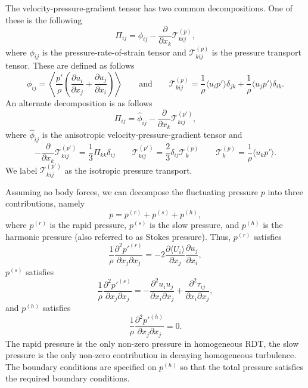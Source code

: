 \documentclass[oneside,a4paper,11pt]{report}
\newcommand{\pfluc}{p'}
\newcommand{\rs}{\tau}          %
\newcommand{\redi}{\phi}        %
\newcommand{\uiavg}{\langle U_i \rangle}
\newcommand{\uifluc}{u_i}
\newcommand{\ujfluc}{u_j}
\newcommand{\ukfluc}{u_k}
\begin{document}
The velocity-pressure-gradient tensor has two common decompositions. One of these is the following
\begin{equation}
\Pi_{ij} = \redi_{ij} - \frac{\partial}{\partial x_k} \mathcal{T}^{(p)}_{kij},
\end{equation}
where $\redi_{ij}$ is the pressure-rate-of-strain tensor and $\mathcal{T}^{(p)}_{kij}$ is the pressure transport tensor. These are defined as follows
\begin{equation}
\redi_{ij} = \left \langle \frac{\pfluc}{\rho} \left ( \frac{\partial \uifluc}{\partial x_j} + \frac{\partial \ujfluc}{\partial x_i} \right ) \right \rangle \qquad \text{and} \qquad \mathcal{T}^{(p)}_{kij} = \frac{1}{\rho} \langle \uifluc \pfluc \rangle \delta_{jk} + \frac{1}{\rho} \langle \ujfluc \pfluc \rangle \delta_{ik}.
\end{equation}
An alternate decomposition is as follows
\begin{equation}
\Pi_{ij} = \hat{\redi}_{ij} - \frac{\partial}{\partial x_k} \mathcal{T}^{(p')}_{kij},
\end{equation}
where $\hat{\redi}_{ij}$ is the anisotropic velocity-pressure-gradient tensor and
\begin{equation}
- \frac{\partial}{\partial x_k} \mathcal{T}^{(p')}_{kij} = \frac{1}{3} \Pi_{kk} \delta_{ij} \qquad
\mathcal{T}^{(p')}_{kij} =  \frac{2}{3} \delta_{ij} \mathcal{T}^{(p)}_k \qquad
\mathcal{T}^{(p)}_{k} = \frac{1}{\rho} \langle \ukfluc \pfluc \rangle.
\end{equation}
We label $\mathcal{T}^{(p')}_{kij}$ as the isotropic pressure transport.

Assuming no body forces, we can decompose the fluctuating pressure $p$ into three contributions, namely
\begin{equation}
p = p^{(r)} + p^{(s)} + p^{(h)},
\end{equation}
where $p^{(r)}$ is the rapid pressure, $p^{(s)}$ is the slow pressure, and $p^{(h)}$ is the harmonic pressure (also referred to as Stokes pressure). Thus, $p^{(r)}$ satisfies
\begin{equation}
\frac{1}{\rho} \frac{\partial^2 \pfluc^{(r)}}{\partial x_j \partial x_j} = -2 \frac{\partial \uiavg}{\partial x_j} \frac{\partial \ujfluc}{\partial x_i},
\end{equation}
$p^{(s)}$ satisfies
\begin{equation}
\frac{1}{\rho} \frac{\partial^2 \pfluc^{(s)}}{\partial x_j \partial x_j} = - \frac{\partial^2 \uifluc \ujfluc}{\partial x_i \partial x_j} + \frac{\partial^2 \rs_{ij}}{\partial x_i \partial x_j},
\end{equation}
and $p^{(h)}$ satisfies
\begin{equation}
\frac{1}{\rho} \frac{\partial^2 \pfluc^{(h)}}{\partial x_j \partial x_j} = 0.
\end{equation}
The rapid pressure is the only non-zero pressure in homogeneous RDT, the slow pressure is the only non-zero contribution in decaying homogeneous turbulence. The boundary conditions are specified on $p^{(h)}$ so that the total pressure satisfies the required boundary conditions.
\end{document}

